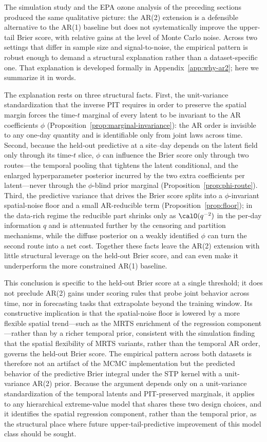 The simulation study and the EPA ozone analysis of the preceding sections produced the same qualitative picture: the AR(2) extension is a defensible alternative to the AR(1) baseline but does not systematically improve the upper-tail Brier score, with relative gains at the level of Monte Carlo noise.  Across two settings that differ in sample size and signal-to-noise, the empirical pattern is robust enough to demand a structural explanation rather than a dataset-specific one.  That explanation is developed formally in Appendix~\ref{app:why-ar2}; here we summarize it in words.

The explanation rests on three structural facts.  First, the unit-variance standardization that the inverse PIT requires in order to preserve the spatial \skewt margin forces the time-$t$ marginal of every latent to be invariant to the AR coefficients $\phi$ (Proposition~\ref{prop:marginal-invariance}): the AR order is invisible to any one-day quantity and is identifiable only from joint laws across time.  Second, because the held-out predictive at a site--day depends on the latent field only through its time-$t$ slice, $\phi$ can influence the Brier score only through two routes---the temporal pooling that tightens the latent conditional, and the enlarged hyperparameter posterior incurred by the two extra coefficients per latent---never through the $\phi$-blind prior marginal (Proposition~\ref{prop:phi-route}).  Third, the predictive variance that drives the Brier score splits into a $\phi$-invariant spatial-noise floor and a small AR-reducible term (Proposition~\ref{prop:floor}); in the data-rich regime the reducible part shrinks only as $\calO(q^{-2})$ in the per-day information $q$ and is attenuated further by the censoring and partition mechanisms, while the diffuse posterior on a weakly identified $\phi$ can turn the second route into a net cost.  Together these facts leave the AR(2) extension with little structural leverage on the held-out Brier score, and can even make it underperform the more constrained AR(1) baseline.

This conclusion is specific to the held-out Brier score at a single threshold; it does not preclude AR(2) gains under scoring rules that probe joint behavior across time, nor in forecasting tasks that extrapolate beyond the training window.  Its constructive implication is that the spatial-noise floor is lowered by a more flexible spatial trend---such as the MRTS enrichment of the regression component---rather than by a richer temporal prior, consistent with the simulation finding that the spatial flexibility of MRTS variants, rather than the temporal AR order, governs the held-out Brier score.  The empirical pattern across both datasets is therefore not an artifact of the MCMC implementation but the predicted behavior of the predictive Brier integral under the STP kernel with a unit-variance AR(2) prior.  Because the argument depends only on a unit-variance standardization of the temporal latents and PIT-preserved marginals, it applies to any hierarchical extreme-value model that shares these two design choices, and it identifies the spatial regression component, rather than the temporal prior, as the structural place where future upper-tail-predictive improvement of this model class should be sought.

